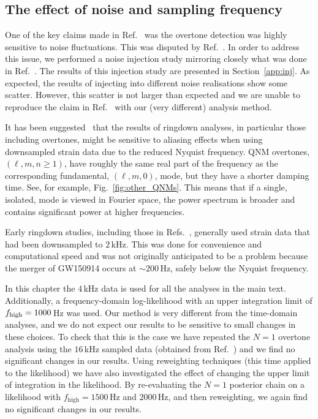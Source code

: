 \subsection{The effect of noise and sampling frequency}\label{subsec:noise}

One of the key claims made in Ref.~\cite{Cotesta:2022pci} was the overtone detection was highly sensitive to noise fluctuations.
This was disputed by Ref.~\cite{Isi:2022mhy}.
In order to address this issue, we performed a noise injection study mirroring closely what was done in Ref.~\cite{Cotesta:2022pci}.
The results of this injection study are presented in Section~\ref{app:inj}.
As expected, the results of injecting into different noise realisations show some scatter.
However, this scatter is not larger than expected and we are unable to reproduce the claim in Ref.~\cite{Cotesta:2022pci} with our (very different) analysis method. 

It has been suggested~\cite{WillMaxTGRtelecon} that the results of ringdown analyses, in particular those including overtones, might be sensitive to aliasing effects when using downsampled strain data due to the reduced Nyquist frequency.
QNM overtones, $(\ell, m, n \geq 1)$, have roughly the same real part of the frequency as the corresponding fundamental, $(\ell, m, 0)$, mode, but they have a shorter damping time. 
See, for example, Fig.~\ref{fig:other_QNMs}. 
This means that if a single, isolated, mode is viewed in Fourier space, the power spectrum is broader and contains significant power at higher frequencies.

Early ringdown studies, including those in Refs.~\cite{LIGOScientific:2016lio, Isi:2019aib, Isi:2022mhy}, generally used strain data that had been downsampled to $2\,$kHz. 
This was done for convenience and computational speed and was not originally anticipated to be a problem because the merger of GW150914 occurs at $\sim 200\,\mathrm{Hz}$, safely below the Nyquist frequency.

In this chapter the $4\,$kHz data is used for all the analyses in the main text. 
Additionally, a frequency-domain log-likelihood with an upper integration limit of $f_{\rm high}=1000\,$Hz was used.
Our method is very different from the time-domain analyses, and we do not expect our results to be sensitive to small changes in these choices.
To check that this is the case we have repeated the $N=1$ overtone analysis using the $16\,$kHz sampled data (obtained from Ref.~\cite{gwosc}) and we find no significant changes in our results.
Using reweighting techniques (this time applied to the likelihood) we have also investigated the effect of changing the upper limit of integration in the likelihood. 
By re-evaluating the $N=1$ posterior chain on a likelihood with $f_\mathrm{high}=1500\,$Hz and $2000\,$Hz, and then reweighting, we again find no significant changes in our results.


